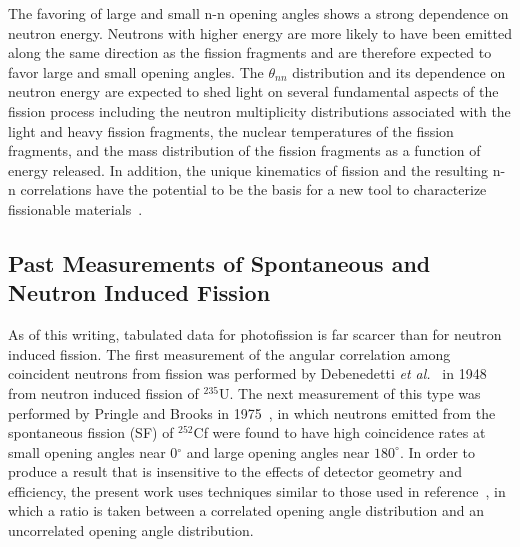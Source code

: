 \documentclass[%
 reprint,
 calc,
 amsmath,amssymb,
 aps,
 nofootinbib,
 linenumbers
]{revtex4-1}
\begin{document}
The favoring of large and small n-n opening angles shows a strong dependence on neutron energy.
Neutrons with higher energy are more likely to have been emitted along the same direction as the fission fragments and are therefore expected to favor large and small opening angles.
The $\theta_{nn}$ distribution and its dependence on neutron energy are expected to shed light on several fundamental aspects of the fission process including the neutron multiplicity distributions associated with the light and heavy fission fragments, the nuclear temperatures of the fission fragments, and the mass distribution of the fission fragments as a function of energy released.
In addition, the unique kinematics of fission and the resulting n-n correlations have the potential to be the basis for a new tool to characterize fissionable materials~\cite{Talou2018}. %


\subsection{Past Measurements of Spontaneous and Neutron Induced Fission}
As of this writing, tabulated data for photofission is far scarcer than for neutron induced fission.
The first measurement of the angular correlation among coincident neutrons from fission was performed by Debenedetti \emph{et al.}~\cite{1948twoNCorr} in 1948 from neutron induced fission of $^{235}\text{U}$.
The next measurement of this type was performed by Pringle and Brooks in 1975~\cite{1975Cf252}, in which neutrons emitted from the spontaneous fission (SF) of $^{252}$Cf were found to have high coincidence rates at small opening angles near 0$^{\circ}$ and large opening angles near $180^{\circ}$.
In order to produce a result that is insensitive to the effects of detector geometry and efficiency, the present work uses techniques similar to those used in reference~\cite{1975Cf252}, in which a ratio is taken between a correlated opening angle distribution and an uncorrelated opening angle distribution.
\end{document}
